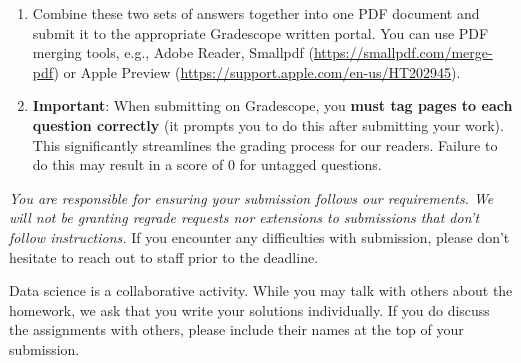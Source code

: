 \documentclass[addpoints, 12pt]{exam}
\theoremstyle{definition}
\begin{document}
\begin{enumerate}
    \item Combine these two sets of answers together into one PDF document and submit it to the appropriate Gradescope written portal. You can use PDF merging tools, e.g., Adobe Reader, Smallpdf (\url{https://smallpdf.com/merge-pdf}) or Apple Preview (\url{https://support.apple.com/en-us/HT202945}).

    \item \textbf{Important}: When submitting on Gradescope, you \textbf{must tag pages to each question correctly} (it prompts you to do this after submitting your work). This significantly streamlines the grading process for our readers. Failure to do this may result in a score of 0 for untagged questions.
\end{enumerate}

\noindent \textit{You are responsible for ensuring your submission follows our requirements. We will not be granting regrade requests nor extensions to submissions that don't follow instructions.} If you encounter any difficulties with submission, please don't hesitate to reach out to staff prior to the deadline.


\noindent Data science is a collaborative activity. While you may talk with others about the homework, we ask that you write your solutions individually. If you do discuss the assignments with others, please include their names at the top of your submission.


\newpage
\end{document}
